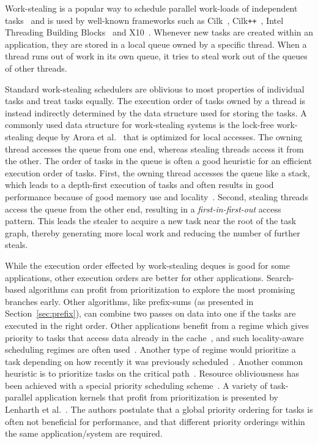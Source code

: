 \documentclass[a4paper,11pt]{article}
\begin{document}
Work-stealing is a popular way to schedule parallel work-loads of
independent tasks~\cite{BlumofeLeiserson99} and is used by well-known
frameworks such as
Cilk~\cite{BlumofeJoergKuszmaulLeisersonRandallZhou96},
Cilk\verb!++!~\cite{Leiserson10}, Intel Threading Building
Blocks~\cite{KukanovVoss07} and X10~\cite{Charles05}.  Whenever new
tasks are created within an application, they are stored in a local
queue owned by a specific thread. When a thread runs out of work in
its own queue, it tries to steal work out of the queues of other
threads.

Standard work-stealing schedulers are oblivious to most properties of
individual tasks and treat tasks equally.  The execution order of
tasks owned by a thread is instead indirectly determined by the
data structure used for storing the tasks.  A commonly used
data structure for work-stealing systems is the lock-free
work-stealing deque by Arora et al.~\cite{AroraBlumofePlaxton01} that
is optimized for local accesses.  The owning thread accesses the queue
from one end, whereas stealing threads access it from the other.  The
order of tasks in the queue is often a good heuristic for an efficient
execution order of tasks. First, the owning thread accesses the queue
like a stack, which leads to a depth-first execution of tasks and
often results in good performance because of good memory use and
locality~\cite{AcarBlellochBlumofe02}. Second, stealing
threads access the queue from the other end, resulting in a
\emph{first-in-first-out} access pattern. This leads the stealer to
acquire a new task near the root of the task graph, thereby generating
more local work and reducing the number of further steals.

While the
execution order effected by work-stealing deques
is good for some applications, other execution orders are better for
other applications. Search-based algorithms can profit from
prioritization to explore the most promising branches early. Other
algorithms, like prefix-sums (as presented in
Section~\ref{sec:prefix}), can combine two passes on data into one if
the tasks are executed in the right order. Other applications benefit
from a regime which gives priority to tasks that access data already
in the cache~\cite{Weissman98}, and such locality-aware scheduling
regimes are often used~\cite{GuoZhaoCaveSarkar10}. Another type of
regime would prioritize a task depending on how recently it was
previously scheduled~\cite{Squillante93}.  Another common heuristic is
to prioritize tasks on the critical path~\cite{Song09}. Resource
obliviousness has been achieved with a special priority scheduling
scheme~\cite{ColeRamachandran10}.  A variety of task-parallel
application kernels that profit from prioritization is presented by
Lenharth et al.~\cite{pingali2011}. The authors postulate that a
global priority ordering for tasks is often not beneficial for
performance, and that different priority orderings within the same
application/system are required.
\end{document}

